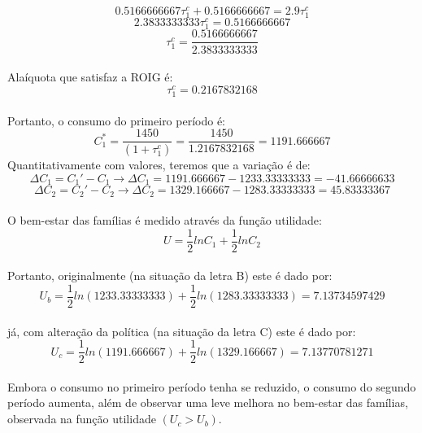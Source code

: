 \documentclass{article}
\begin{document}
\begin{equation}
    0.5166666667\tau_1^c + 0.5166666667 = 2.9\tau_1^c 
\end{equation}
\begin{equation}
    2.3833333333\tau_1^c=0.5166666667
\end{equation}
\begin{equation}
    \tau_1^c=\frac{0.5166666667}{2.3833333333} 
\end{equation}
\\
Alaíquota que satisfaz a ROIG é:
\begin{equation}
    \tau_1^c= 0.2167832168
\end{equation}
\\
Portanto, o consumo do primeiro período é:
\begin{equation}
    C_1^*=\frac{1450}{(1+\tau_1^c)}=\frac{1450}{1.2167832168}=1191.666667
\end{equation}
Quantitativamente com valores, teremos que a variação é de:
\begin{equation}
    \Delta C_1 = C_1' - C_1 \to \Delta C_1 = 1191.666667 - 1233.33333333 = -41.66666633
\end{equation}
\begin{equation}
    \Delta C_2 = C_2' - C_2 \to \Delta C_2 =  1329.166667 - 1283.33333333 = 45.83333367    
\end{equation}
\\
O bem-estar das famílias é medido através da função utilidade:
\begin{equation}
    U=\frac{1}{2}ln C_1 + \frac{1}{2} ln C_2
\end{equation}
\\
Portanto, originalmente (na situação da letra B) este é dado por:
\begin{equation}
    U_b=\frac{1}{2}ln(1233.33333333) + \frac{1}{2}ln(1283.33333333) = 7.13734597429
\end{equation}
\\
já, com alteração da política (na situação da letra C) este é dado por:
\begin{equation}
    U_c=\frac{1}{2}ln(1191.666667) + \frac{1}{2}ln(1329.166667) = 7.13770781271
\end{equation}
\\
Embora o consumo no primeiro período tenha se reduzido, o consumo do segundo período aumenta, além de observar uma leve melhora no bem-estar das famílias, observada na função utilidade $(U_c > U_b)$.
\end{document}
